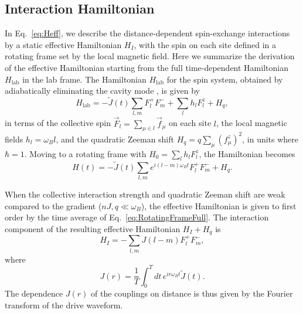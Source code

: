 \documentclass[aps,pra,twocolumn,superscriptaddress]{revtex4-1} %
\begin{document}
\begin{bibunit}
\subsection{Interaction Hamiltonian}


In Eq.~\eqref{eq:Heff}, we describe the distance-dependent spin-exchange interactions by a static effective Hamiltonian $H_I$, with the spin on each site defined in a rotating frame set by the local magnetic field.  Here we summarize the derivation of the effective Hamiltonian starting from the full time-dependent Hamiltonian $H_\mathrm{lab}$ in the lab frame.  The Hamiltonian $H_\mathrm{lab}$ for the spin system, obtained by adiabatically eliminating the cavity mode \cite{davis2019photon,davis2020protecting}, is given by \begin{equation}\label{eq:Hlab}
H_\text{lab}=-\tilde{J}(t) \sum_{l,m} F^+_l F^-_m + \sum_l h_l F^z_l + H_q,
\end{equation}
in terms of the collective spin $\vec{F}_l = \sum_{\mu \in l} \vec{f}_\mu$ on each site $l$, the local magnetic fields $h_l = \omega_B l$, and the quadratic Zeeman shift $H_q = q \sum_\mu (f^z_\mu)^2$, in units where $\hbar = 1$. Moving to a rotating frame with $H_0 = \sum_l h_l F^z_l$, the Hamiltonian becomes 
\begin{equation}
  H(t)=-\tilde{J}(t) \sum_{l,m} e^{i(l-m)\omega_B t} F^+_l F^-_m + H_q.
  \label{eq:RotatingFrameFull}
\end{equation}

When the collective interaction strength and quadratic Zeeman shift are weak compared to the gradient ($nJ, q \ll \omega_B$), the effective Hamiltonian is given to first order by the time average of Eq.~\eqref{eq:RotatingFrameFull}. The interaction component of the resulting effective Hamiltonian $H_I + H_q$ is
\begin{equation}
  H_I = -\sum_{l,m} J(l-m) F^+_l  F^-_{m},
\end{equation}
where 
\begin{equation}
   J(r) = \frac{1}{T} \int_0^T dt\, e^{i r \omega_B t} \tilde{J}(t).
\end{equation}
The dependence $J(r)$ of the couplings on distance is thus given by the Fourier transform of the drive waveform.


\end{bibunit}
\end{document}
